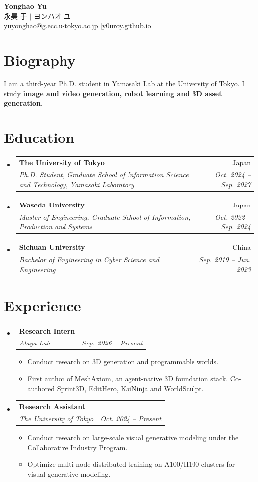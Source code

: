\documentclass[letterpaper,11pt]{article}
\makeatletter
\newcommand{\resumeItem}[1]{
  \item\small{
    {#1 \vspace{-2pt}}
  }
}
\newcommand{\resumeSubheading}[4]{
  \vspace{-2pt}\item
    \begin{tabular*}{0.97\textwidth}[t]{l@{\extracolsep{\fill}}r}
      \textbf{#1} & #2 \\
      \textit{\small#3} & \textit{\small #4} \\
    \end{tabular*}\vspace{-7pt}
}
\newcommand{\resumeSubHeadingListStart}{\begin{itemize}[leftmargin=0.15in, label={}]}
\newcommand{\resumeSubHeadingListEnd}{\end{itemize}}
\newcommand{\resumeItemListStart}{\begin{itemize}}
\newcommand{\resumeItemListEnd}{\end{itemize}\vspace{-5pt}}
\makeatother
\begin{document}
\begin{center}
    \textbf{\Huge Yonghao Yu} \\ \vspace{3pt}
    \small {\cjkfont 永昊 于} $|$ {\cjkfont ヨンハオ ユ} \\ \vspace{1pt}
    \small \href{mailto:yuyonghao@g.ecc.u-tokyo.ac.jp}{yuyonghao@g.ecc.u-tokyo.ac.jp}%
    \enspace$|$\enspace\href{https://y0uroy.github.io/}{y0uroy.github.io}
\end{center}

\section{Biography}
\small{I am a third-year Ph.D. student in Yamasaki Lab at the University of Tokyo. I study \textbf{image and video generation, robot learning and 3D asset generation}.}

\section{Education}
  \resumeSubHeadingListStart
    \resumeSubheading
      {The University of Tokyo}{Japan}
      {Ph.D. Student, Graduate School of Information Science and Technology, Yamasaki Laboratory}{Oct. 2024 -- Sep. 2027}
    \resumeSubheading
      {Waseda University}{Japan}
      {Master of Engineering, Graduate School of Information, Production and Systems}{Oct. 2022 -- Sep. 2024}
    \resumeSubheading
      {Sichuan University}{China}
      {Bachelor of Engineering in Cyber Science and Engineering}{Sep. 2019 -- Jun. 2023}
  \resumeSubHeadingListEnd

\section{Experience}
  \resumeSubHeadingListStart
    \resumeSubheading
      {Research Intern}{}
      {Alaya Lab}{Sep. 2026 -- Present}
      \resumeItemListStart
        \resumeItem{Conduct research on 3D generation and programmable worlds.}
        \resumeItem{First author of MeshAxiom, an agent-native 3D foundation stack. Co-authored \href{https://alaya-lab.github.io/sprint3d/}{Sprint3D}, EditHero, KaiNinja and WorldSculpt.}
      \resumeItemListEnd
    \resumeSubheading
      {Research Assistant}{}
      {The University of Tokyo}{Oct. 2024 -- Present}
      \resumeItemListStart
        \resumeItem{Conduct research on large-scale visual generative modeling under the Collaborative Industry Program.}
        \resumeItem{Optimize multi-node distributed training on A100/H100 clusters for visual generative modeling.}
      \resumeItemListEnd
  \resumeSubHeadingListEnd
\end{document}
